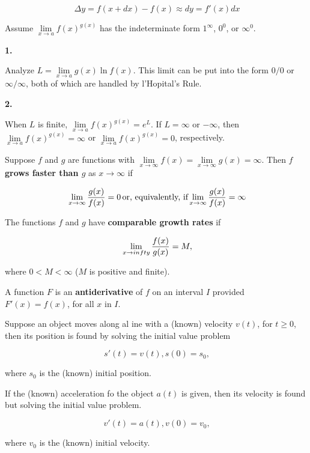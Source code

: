 $$\
\Delta y = f(x + dx) - f(x) \approx dy = f'(x) dx
$$
\enddef

Assume $\lim\limits_{x \to a}f(x)^{g(x)}$ has the indeterminate form
$1^{\infty}$, $0^0$, or $\infty^0$.

{\par \bf 1.}
Analyze $L = \lim\limits_{x \to a} g(x) \ln f(x)$.
This limit can be put into the form $0/0$ or $\infty / \infty$,
both of which are handled by l'Hopital's Rule.

{\par \bf 2.}
When $L$ is finite, $\lim\limits_{x \to a} f(x)^{g(x)} = e^L$.
If $L = \infty$ or $-\infty$, then
$\lim\limits_{x \to a} f(x)^{g(x)} = \infty$
or
$\lim\limits_{x \to a} f(x)^{g(x)} = 0$, respectively.
\enddef

Suppose $f$ and $g$ are functions with
$\lim\limits_{x \to \infty} f(x) =
\lim\limits_{x \to \infty} g(x) = \infty$.
Then
{\bf $f$ grows faster than $g$} as $x \to \infty$ if

$$\
\lim_{x \to \infty} {g(x) \over f(x)} = 0 \,
\hbox{or, equivalently, if}
\lim_{x \to \infty} {g(x) \over f(x)} = \infty
$$

The functions $f$ and $g$ have {\bf comparable growth rates}
if

$$\
\lim_{x \to infty} {f(x) \over g(x)} = M,
$$

where $0 < M < \infty$ ($M$ is positive and finite).

\enddef

A function $F$ is an {\bf antiderivative} of $f$ on an interval
$I$ provided $F'(x) = f(x)$, for all $x$ in $I$.
\enddef

Suppose an object moves along al ine with a (known) velocity $v(t)$,
for $t \ge 0$, then its position is found by solving the initial
value problem

$$\
s'(t) = v(t), s(0) = s_0,
$$

where $s_0$ is the (known) initial position.

\par If the (known) acceleration fo the object $a(t)$ is
given, then its velocity is found
but solving the initial value problem.

$$\
v'(t) = a(t), v(0) = v_0,
$$

where $v_0$ is the (known) initial velocity.
\enddef

